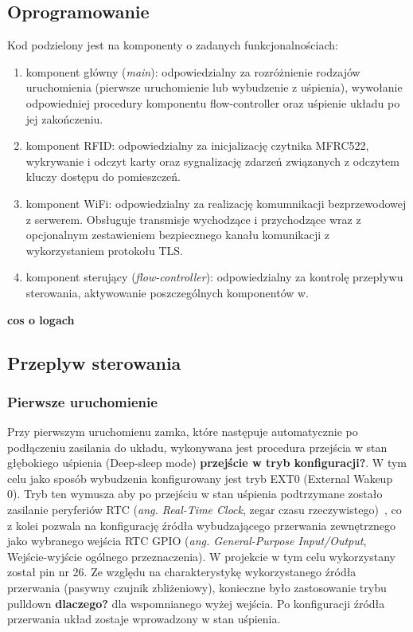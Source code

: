     \subsection{Oprogramowanie}
        Kod podzielony jest na komponenty o zadanych funkcjonalnościach:
        \begin{enumerate}
            \item komponent główny (\textit{main}): odpowiedzialny za rozróżnienie rodzajów uruchomienia (pierwsze uruchomienie lub wybudzenie z uśpienia), wywołanie odpowiedniej procedury komponentu flow-controller oraz uśpienie układu po jej zakończeniu.
            \item komponent RFID: odpowiedzialny za inicjalizację czytnika MFRC522, wykrywanie i odczyt karty oraz sygnalizację zdarzeń związanych z odczytem kluczy dostępu do pomieszczeń.
            \item komponent WiFi: odpowiedzialny za realizację komumnikacji bezprzewodowej z serwerem. Obsługuje transmisje wychodzące i przychodzące wraz z opcjonalnym zestawieniem bezpiecznego kanału komunikacji z wykorzystaniem protokołu TLS.
            \item komponent sterujący (\textit{flow-controller}): odpowiedzialny za kontrolę przepływu sterowania, aktywowanie poszczególnych komponentów w.
        \end{enumerate}
        \textbf{cos o logach}

    \subsection{Przeplyw sterowania}

        \subsubsection{Pierwsze uruchomienie}

            Przy pierwszym uruchomienu zamka, które następuje automatycznie po podłączeniu zasilania do układu, wykonywana jest procedura przejścia w stan głębokiego uśpienia (Deep-sleep mode) \textbf{przejście w tryb konfiguracji?}. W tym celu jako sposób wybudzenia konfigurowany jest tryb EXT0 (External Wakeup 0). Tryb ten wymusza aby po przejściu w stan uśpienia podtrzymane zostało zasilanie peryferiów RTC (\textit{ang. Real-Time Clock}, zegar czasu rzeczywistego)~\cite{esp32-api-ref}, co z kolei pozwala na konfigurację źródła wybudzającego przerwania zewnętrznego jako wybranego wejścia RTC GPIO (\textit{ang. General-Purpose Input/Output}, Wejście-wyjście ogólnego przeznaczenia). W projekcie w tym celu wykorzystany został pin nr 26. Ze względu na charakterystykę wykorzystanego źródła przerwania (pasywny czujnik zbliżeniowy), konieczne było zastosowanie trybu pulldown \textbf{dlaczego?} dla wspomnianego wyżej wejścia. Po konfiguracji źródła przerwania układ zostaje wprowadzony w stan uśpienia.

